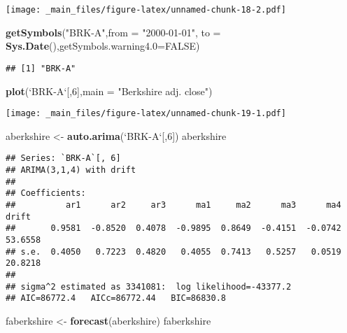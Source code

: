 \documentclass[]{book}
\newenvironment{Shaded}{\begin{snugshade}}{\end{snugshade}}
\newcommand{\DataTypeTok}[1]{\textcolor[rgb]{0.13,0.29,0.53}{#1}}
\newcommand{\DecValTok}[1]{\textcolor[rgb]{0.00,0.00,0.81}{#1}}
\newcommand{\KeywordTok}[1]{\textcolor[rgb]{0.13,0.29,0.53}{\textbf{#1}}}
\newcommand{\NormalTok}[1]{#1}
\newcommand{\OtherTok}[1]{\textcolor[rgb]{0.56,0.35,0.01}{#1}}
\newcommand{\StringTok}[1]{\textcolor[rgb]{0.31,0.60,0.02}{#1}}
\begin{document}
\texttt{[image: \_main\_files/figure-latex/unnamed-chunk-18-2.pdf]}

\begin{Shaded}
\begin{Highlighting}[]
\KeywordTok{getSymbols}\NormalTok{(}\StringTok{"BRK-A"}\NormalTok{,}\DataTypeTok{from =} \StringTok{"2000-01-01"}\NormalTok{, }\DataTypeTok{to =} \KeywordTok{Sys.Date}\NormalTok{(),}\DataTypeTok{getSymbols.warning4.0=}\OtherTok{FALSE}\NormalTok{)}
\end{Highlighting}
\end{Shaded}

\begin{verbatim}
## [1] "BRK-A"
\end{verbatim}

\begin{Shaded}
\begin{Highlighting}[]
\KeywordTok{plot}\NormalTok{(}\StringTok{`}\DataTypeTok{BRK-A}\StringTok{`}\NormalTok{[,}\DecValTok{6}\NormalTok{],}\DataTypeTok{main =} \StringTok{"Berkshire adj. close"}\NormalTok{)}
\end{Highlighting}
\end{Shaded}

\texttt{[image: \_main\_files/figure-latex/unnamed-chunk-19-1.pdf]}

\begin{Shaded}
\begin{Highlighting}[]
\NormalTok{aberkshire <-}\StringTok{ }\KeywordTok{auto.arima}\NormalTok{(}\StringTok{`}\DataTypeTok{BRK-A}\StringTok{`}\NormalTok{[,}\DecValTok{6}\NormalTok{])}
\NormalTok{aberkshire}
\end{Highlighting}
\end{Shaded}

\begin{verbatim}
## Series: `BRK-A`[, 6] 
## ARIMA(3,1,4) with drift 
## 
## Coefficients:
##          ar1      ar2     ar3      ma1     ma2      ma3      ma4    drift
##       0.9581  -0.8520  0.4078  -0.9895  0.8649  -0.4151  -0.0742  53.6558
## s.e.  0.4050   0.7223  0.4820   0.4055  0.7413   0.5257   0.0519  20.8218
## 
## sigma^2 estimated as 3341081:  log likelihood=-43377.2
## AIC=86772.4   AICc=86772.44   BIC=86830.8
\end{verbatim}

\begin{Shaded}
\begin{Highlighting}[]
\NormalTok{faberkshire <-}\StringTok{ }\KeywordTok{forecast}\NormalTok{(aberkshire)}
\NormalTok{faberkshire}
\end{Highlighting}
\end{Shaded}
\end{document}
